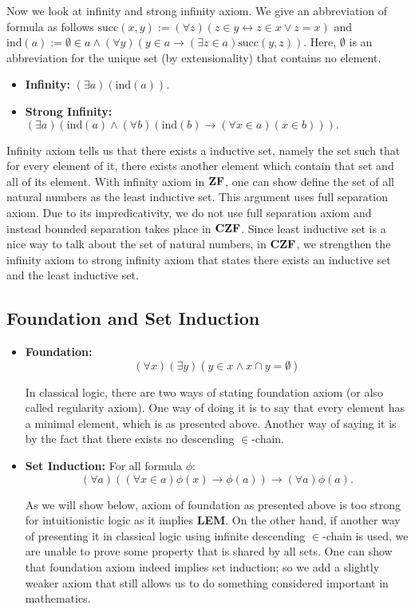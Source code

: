 \documentclass[12pt, a4paper]{article}
\theoremstyle{definition}
\theoremstyle{plain}
\begin{document}
Now we look at infinity and strong infinity axiom.
We give an abbreviation of formula as follows $\text{succ}(x,y):=(\forall z)(z \in y \leftrightarrow z \in x \vee z=x)$ and $\text{ind}(a):= \emptyset \in a \wedge (\forall y)(y \in a \rightarrow (\exists z \in a)\text{succ}(y,z))$.
Here, $\emptyset$ is an abbreviation for the unique set (by extensionality) that contains no element.

\begin{itemize}
\item {\bf Infinity:} $(\exists a)(\text{ind}(a))$.
\item {\bf Strong Infinity:} $(\exists a)(\text{ind}(a) \wedge (\forall b)(\text{ind}(b) \rightarrow (\forall x \in a)(x \in b))).$
\end{itemize}

Infinity axiom tells us that there exists a inductive set, namely the set such that for every element of it, there exists another element which contain that set and all of its element.
With infinity axiom in ${\bf ZF}$, one can show define the set of all natural numbers as the least inductive set.
This argument uses full separation axiom.
Due to its impredicativity, we do not use full separation axiom and instead bounded separation takes place in ${\bf CZF}$.
Since least inductive set is a nice way to talk about the set of natural numbers, in ${\bf CZF}$, we strengthen the infinity axiom to strong infinity axiom that states there exists an inductive set and the least inductive set.

\subsection{Foundation and Set Induction}

\begin{itemize}
\item {\bf Foundation:} $$(\forall x)(\exists y) (y \in x \wedge x \cap y=\emptyset)$$

In classical logic, there are two ways of stating foundation axiom (or also called regularity axiom).
One way of doing it is to say that every element has a minimal element, which is as presented above.
Another way of saying it is by the fact that there exists no descending $\in$-chain.
\item {\bf Set Induction:} For all formula $\phi$: $$(\forall a)((\forall x \in a)\phi(x) \rightarrow \phi(a)) \rightarrow (\forall a)\phi(a).$$

As we will show below, axiom of foundation as presented above is too strong for intuitionistic logic as it implies {\bf LEM}. 
On the other hand, if another way of presenting it in classical logic using infinite descending $\in$-chain is used, we are unable to prove some property that is shared by all sets.
One can show that foundation axiom indeed implies set induction; so we add a slightly weaker axiom that still allows us to do something considered important in mathematics.
\end{itemize}
\end{document}
